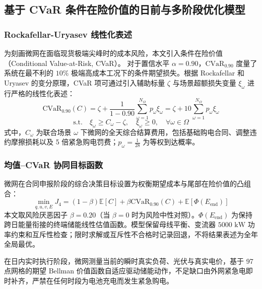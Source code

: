 \documentclass[withoutpreface]{cumcmthesis}
\begin{document}
\subsection{基于 CVaR 条件在险价值的日前与多阶段优化模型}

\subsubsection{Rockafellar-Uryasev 线性化表述}
为刻画微网在面临现货极端尖峰时的成本风险，本文引入条件在险价值（Conditional Value-at-Risk, CVaR）\cite{bib:rockafellar}。
对于置信水平 $\alpha = 0.90$，$\text{CVaR}_{0.90}$ 度量了系统在最不利的 $10\%$ 极端高成本工况下的条件期望损失。根据 Rockafellar 和 Uryasev 的变分原理，CVaR 项可通过引入辅助标量 $\zeta$ 与场景超额损失变量 $\xi_\omega$ 进行严格的线性化表述：
\begin{equation}
    \text{CVaR}_{0.90}(C) = \zeta + \frac{1}{1 - 0.90} \sum_{\omega=1}^{N_\Omega} p_\omega \xi_\omega = \zeta + 10 \sum_{\omega=1}^{N_\Omega} p_\omega \xi_\omega \label{eq:q4_cvar_def}
\end{equation}
\begin{equation}
    \text{s.t.} \quad \xi_\omega \ge C_\omega - \zeta, \quad \xi_\omega \ge 0, \quad \forall \omega \in \Omega
\end{equation}
式中，$C_\omega$ 为联合场景 $\omega$ 下微网的全天综合结算费用，包括基础购电合同、调整违约摩擦损耗以及 5 倍紧急购电罚费；$p_\omega = \frac{1}{28}$ 为等权到达概率。

\subsubsection{均值--CVaR 协同目标函数}
微网在合同申报阶段的综合决策目标设置为权衡期望成本与尾部在险价值的凸组合：
\begin{equation}
    \min_{q, u, v, E} J_4 = (1 - \beta) \mathbb{E}[C] + \beta \text{CVaR}_{0.90}(C) + \mathbb{E}[\Phi(E_{\text{end}})] \label{eq:q4_obj}
\end{equation}
本文取风险厌恶因子 $\beta = 0.20$（当 $\beta = 0$ 时为风险中性对照）。$\Phi(E_{\text{end}})$ 为保持跨日能量衔接的终端储能线性估值函数。模型保留母线平衡、变流器 $5000\text{ kW}$ 功率约束和互斥性检查；限时求解或互斥性不合格时记录回退，不将结果表述为全年全局最优。

在日内实时执行阶段，微网测量当前的瞬时真实负荷、光伏与真实电价，基于 97 点网格的期望 Bellman 价值函数自适应驱动储能动作，不足缺口由外网紧急电即时补齐，严禁在任何时段为电池充电而发生紧急购电。
\end{document}
